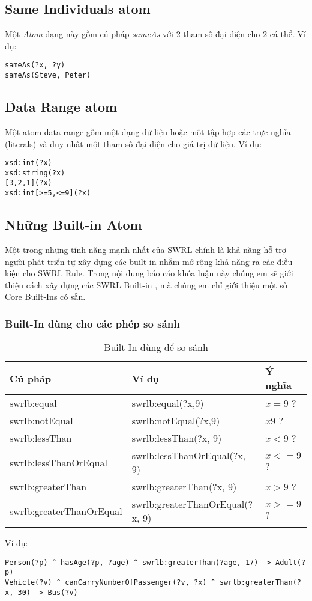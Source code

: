 \subsection{Same Individuals atom}
Một \textit{Atom} dạng này gồm cú pháp \textit{sameAs} với 2 tham số đại diện cho 2 cá thể. Ví dụ:
\begin{verbatim}
sameAs(?x, ?y)
sameAs(Steve, Peter)
\end{verbatim}

\subsection{Data Range atom}
Một atom data range gồm một dạng dữ liệu hoặc một tập hợp các trực nghĩa (literals) và duy nhất một tham số đại diện cho giá trị dữ liệu. Ví dụ:
\begin{verbatim}
xsd:int(?x)
xsd:string(?x)
[3,2,1](?x)
xsd:int[>=5,<=9](?x)
\end{verbatim}

\subsection{Những Built-in Atom}
Một trong những tính năng mạnh nhất của SWRL chính là khả năng hỗ trợ người phát triển tự xây dựng các built-in nhằm mở rộng khả năng ra các điều kiện cho SWRL Rule. Trong nội dung báo cáo khóa luận này chúng em sẽ giới thiệu cách xây dựng các SWRL Built-in \cite{swrlbuiltin}, mà chúng em chỉ giới thiệu một số Core Built-Ins \cite{swrlcorebuiltin} có sẵn.
\subsubsection{Built-In dùng cho các phép so sánh}
\begin{table}[!h]
	\centering
	\begin{tabular}{|l|l|l|}
		\hline
		Cú pháp & Ví dụ & Ý nghĩa \\ 
		\hline
		swrlb:equal & swrlb:equal(?x,9) & $x = 9$  ? \\		
		\hline
		swrlb:notEqual & swrlb:notEqual(?x,9) & $x  9$  ? \\		
		\hline
		swrlb:lessThan & swrlb:lessThan(?x, 9) & $x < 9$ ? \\
		\hline
		swrlb:lessThanOrEqual & swrlb:lessThanOrEqual(?x, 9) & $x <= 9$ ? \\
		\hline
		swrlb:greaterThan & swrlb:greaterThan(?x, 9) & $x > 9$ ? \\
		\hline
		swrlb:greaterThanOrEqual & swrlb:greaterThanOrEqual(?x, 9) & $x >= 9$ ? \\
		\hline
	\end{tabular}
\caption{Built-In dùng để so sánh\label{overflow}}
\end{table}
Ví dụ:
\begin{verbatim}
Person(?p) ^ hasAge(?p, ?age) ^ swrlb:greaterThan(?age, 17) -> Adult(?p)
Vehicle(?v) ^ canCarryNumberOfPassenger(?v, ?x) ^ swrlb:greaterThan(?x, 30) -> Bus(?v)

\end{verbatim}



